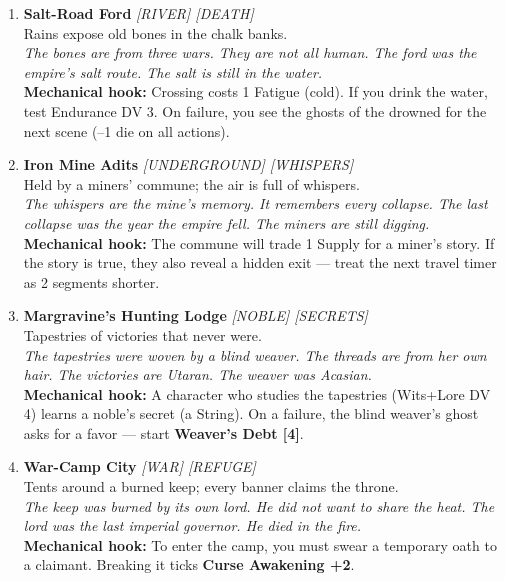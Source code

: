 \begin{enumerate}
\item \textbf{Salt-Road Ford} \hfill {} \textit{[RIVER] [DEATH]} \\
  Rains expose old bones in the chalk banks. \\
  \textit{The bones are from three wars. They are not all human. The ford was the empire's salt route. The salt is still in the water.} \\
  \textbf{Mechanical hook:} Crossing costs 1 Fatigue (cold). If you drink the water, test Endurance DV 3. On failure, you see the ghosts of the drowned for the next scene (--1 die on all actions).

\item \textbf{Iron Mine Adits} \hfill {} \textit{[UNDERGROUND] [WHISPERS]} \\
  Held by a miners' commune; the air is full of whispers. \\
  \textit{The whispers are the mine's memory. It remembers every collapse. The last collapse was the year the empire fell. The miners are still digging.} \\
  \textbf{Mechanical hook:} The commune will trade 1 Supply for a miner's story. If the story is true, they also reveal a hidden exit --- treat the next travel timer as 2 segments shorter.

\item \textbf{Margravine's Hunting Lodge} \hfill {} \textit{[NOBLE] [SECRETS]} \\
  Tapestries of victories that never were. \\
  \textit{The tapestries were woven by a blind weaver. The threads are from her own hair. The victories are Utaran. The weaver was Acasian.} \\
  \textbf{Mechanical hook:} A character who studies the tapestries (Wits+Lore DV 4) learns a noble's secret (a String). On a failure, the blind weaver's ghost asks for a favor --- start \textbf{Weaver's Debt [4]}.

\item \textbf{War-Camp City} \hfill {} \textit{[WAR] [REFUGE]} \\
  Tents around a burned keep; every banner claims the throne. \\
  \textit{The keep was burned by its own lord. He did not want to share the heat. The lord was the last imperial governor. He died in the fire.} \\
  \textbf{Mechanical hook:} To enter the camp, you must swear a temporary oath to a claimant. Breaking it ticks \textbf{Curse Awakening +2}.


\end{enumerate}
